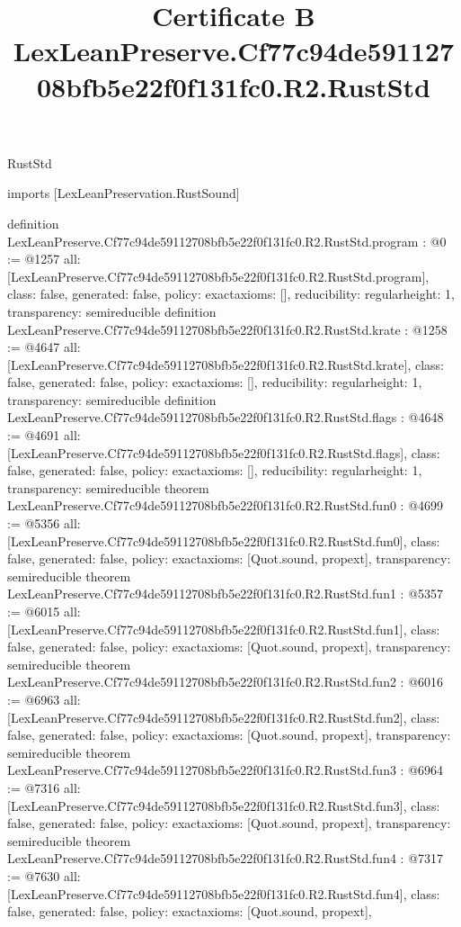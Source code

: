 \begin{lexlean}{RustStd}
\title{Certificate B LexLeanPreserve.Cf77c94de59112708bfb5e22f0f131fc0.R2.RustStd}
\begin{coremodule}
imports [LexLeanPreservation.RustSound]

definition LexLeanPreserve.Cf77c94de59112708bfb5e22f0f131fc0.R2.RustStd.program : @0 := @1257 {
  all: [LexLeanPreserve.Cf77c94de59112708bfb5e22f0f131fc0.R2.RustStd.program],
  class: false,
  generated: false,
  policy: exact{axioms: []},
  reducibility: regular{height: 1},
  transparency: semireducible
}
definition LexLeanPreserve.Cf77c94de59112708bfb5e22f0f131fc0.R2.RustStd.krate : @1258 := @4647 {
  all: [LexLeanPreserve.Cf77c94de59112708bfb5e22f0f131fc0.R2.RustStd.krate],
  class: false,
  generated: false,
  policy: exact{axioms: []},
  reducibility: regular{height: 1},
  transparency: semireducible
}
definition LexLeanPreserve.Cf77c94de59112708bfb5e22f0f131fc0.R2.RustStd.flags : @4648 := @4691 {
  all: [LexLeanPreserve.Cf77c94de59112708bfb5e22f0f131fc0.R2.RustStd.flags],
  class: false,
  generated: false,
  policy: exact{axioms: []},
  reducibility: regular{height: 1},
  transparency: semireducible
}
theorem LexLeanPreserve.Cf77c94de59112708bfb5e22f0f131fc0.R2.RustStd.fun0 : @4699 := @5356 {
  all: [LexLeanPreserve.Cf77c94de59112708bfb5e22f0f131fc0.R2.RustStd.fun0],
  class: false,
  generated: false,
  policy: exact{axioms: [Quot.sound, propext]},
  transparency: semireducible
}
theorem LexLeanPreserve.Cf77c94de59112708bfb5e22f0f131fc0.R2.RustStd.fun1 : @5357 := @6015 {
  all: [LexLeanPreserve.Cf77c94de59112708bfb5e22f0f131fc0.R2.RustStd.fun1],
  class: false,
  generated: false,
  policy: exact{axioms: [Quot.sound, propext]},
  transparency: semireducible
}
theorem LexLeanPreserve.Cf77c94de59112708bfb5e22f0f131fc0.R2.RustStd.fun2 : @6016 := @6963 {
  all: [LexLeanPreserve.Cf77c94de59112708bfb5e22f0f131fc0.R2.RustStd.fun2],
  class: false,
  generated: false,
  policy: exact{axioms: [Quot.sound, propext]},
  transparency: semireducible
}
theorem LexLeanPreserve.Cf77c94de59112708bfb5e22f0f131fc0.R2.RustStd.fun3 : @6964 := @7316 {
  all: [LexLeanPreserve.Cf77c94de59112708bfb5e22f0f131fc0.R2.RustStd.fun3],
  class: false,
  generated: false,
  policy: exact{axioms: [Quot.sound, propext]},
  transparency: semireducible
}
theorem LexLeanPreserve.Cf77c94de59112708bfb5e22f0f131fc0.R2.RustStd.fun4 : @7317 := @7630 {
  all: [LexLeanPreserve.Cf77c94de59112708bfb5e22f0f131fc0.R2.RustStd.fun4],
  class: false,
  generated: false,
  policy: exact{axioms: [Quot.sound, propext]},
}
\end{coremodule}
\end{lexlean}
